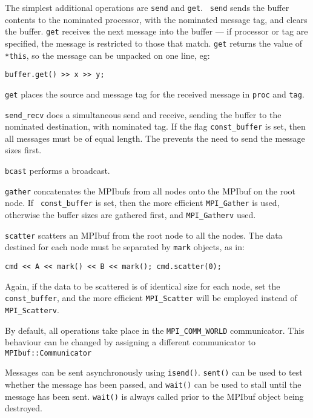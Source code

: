 The simplest additional operations are {\tt send} and {\tt get}. {\tt
  send} sends the buffer contents to the nominated processor, with the
  nominated message tag, and clears the buffer. {\tt get} receives the
  next message into the buffer --- if processor or tag are specified,
  the message is restricted to those that match.
{\tt get} returns the value of \verb+*this+, so the message can be
  unpacked on one line, eg:
\begin{verbatim}
buffer.get() >> x >> y;
\end{verbatim}
  {\tt get} places the source and message tag for the received message
  in {\tt proc} and {\tt tag}.

{\tt send\_recv} does a simultaneous send and
receive, sending the buffer to the nominated destination, with
nominated tag. If the flag {\tt const\_buffer} is
set, then all messages must be of equal length. The prevents the need
to send the message sizes first.

{\tt bcast} performs a broadcast.

{\tt gather} concatenates the MPIbufs from all nodes
onto the MPIbuf on the root node. If {\tt
const\_buffer} is set, then the more efficient
{\tt MPI\_Gather} is used, otherwise the buffer sizes are gathered
first, and {\tt MPI\_Gatherv} used.

{\tt scatter} scatters an MPIbuf from the root node to
all the nodes. The data destined for each node must be separated by
{\tt mark} objects, as in:
\begin{verbatim}
cmd << A << mark() << B << mark(); cmd.scatter(0);
\end{verbatim}
Again, if the data to be scattered is of identical size for each node,
set the  {\tt const\_buffer}, and the more
efficient {\tt MPI\_Scatter} will be employed instead of {\tt MPI\_Scatterv}.

By default, all operations take place in the \verb+MPI_COMM_WORLD+
communicator. This behaviour can be changed by assigning a different
communicator to \verb+MPIbuf::Communicator+

Messages can be sent asynchronously using
\verb+isend()+. \verb+sent()+ can be used to test whether the message
has been passed, and \verb+wait()+ can be used to stall until the
message has been sent. \verb+wait()+ is always called prior to the MPIbuf
object being destroyed.

